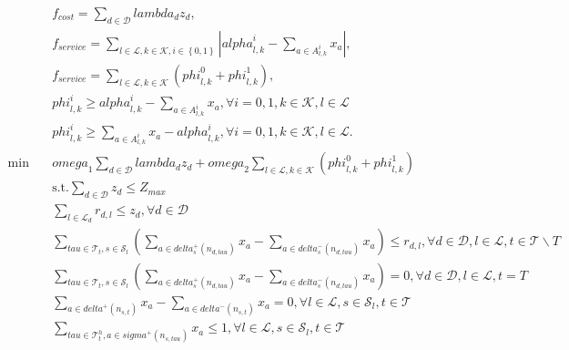 \begin{align}
  & f_{c o s t} = \sum_{d \in \mathcal{D}} \mathit{lambda}_{d} z_{d} , \tag{eq\_0012} \\
  & f_{s e r v i c e} = \sum_{l \in \mathcal{L}, k \in \mathcal{K}, i \in \left\{0 , 1\right\}} \left|\mathit{alpha}_{l , k}^{i} - \sum_{a \in A_{l , k}^{i}} x_{a}\right| , \tag{eq\_0014} \\
  & f_{s e r v i c e} = \sum_{l \in \mathcal{L}, k \in \mathcal{K}} \left(\mathit{phi}_{l , k}^{0} + \mathit{phi}_{l , k}^{1}\right) , \tag{eq\_0018} \\
  & \mathit{phi}_{l , k}^{i} \geq \mathit{alpha}_{l , k}^{i} - \sum_{a \in A_{l , k}^{i}} x_{a} , \forall i = 0 , 1 , k \in \mathcal{K} , l \in \mathcal{L} \tag{eq\_0019} \\
  & \mathit{phi}_{l , k}^{i} \geq \sum_{a \in A_{l , k}^{i}} x_{a} - \mathit{alpha}_{l , k}^{i} , \forall i = 0 , 1 , k \in \mathcal{K} , l \in \mathcal{L} . \tag{eq\_0020} \\
  \min\quad & \mathit{omega}_{1} \sum_{d \in \mathcal{D}} \mathit{lambda}_{d} z_{d} + \mathit{omega}_{2} \sum_{l \in \mathcal{L}, k \in \mathcal{K}} \left(\mathit{phi}_{l , k}^{0} + \mathit{phi}_{l , k}^{1}\right) \tag{eq\_0021} \\
  & \text{s}.\text{t}. \sum_{d \in \mathcal{D}} z_{d} \leq Z_{m a x} \tag{eq\_0023} \\
  & \sum_{l \in \mathcal{L}_{d}} r_{d , l} \leq z_{d} , \forall d \in \mathcal{D} \tag{eq\_0024} \\
  & \sum_{\mathit{tau} \in \mathcal{T}_{t}, s \in \mathcal{S}_{l}} \left(\sum_{a \in \mathit{delta}_{s}^{+} \left(n_{d , \mathit{tau}}\right)} x_{a} - \sum_{a \in \mathit{delta}_{s}^{-} \left(n_{d , \mathit{tau}}\right)} x_{a}\right) \leq r_{d , l} , \forall d \in \mathcal{D} , l \in \mathcal{L} , t \in \mathcal{T} \backslash T \tag{eq\_0025} \\
  & \sum_{\mathit{tau} \in \mathcal{T}_{t}, s \in \mathcal{S}_{l}} \left(\sum_{a \in \mathit{delta}_{s}^{+} \left(n_{d , \mathit{tau}}\right)} x_{a} - \sum_{a \in \mathit{delta}_{s}^{-} \left(n_{d , \mathit{tau}}\right)} x_{a}\right) = 0 , \forall d \in \mathcal{D} , l \in \mathcal{L} , t = T \tag{eq\_0026} \\
  & \sum_{a \in \mathit{delta}^{+} \left(n_{s , t}\right)} x_{a} - \sum_{a \in \mathit{delta}^{-} \left(n_{s , t}\right)} x_{a} = 0 , \forall l \in \mathcal{L} , s \in \mathcal{S}_{l} , t \in \mathcal{T} \tag{eq\_0027} \\
  & \sum_{\mathit{tau} \in \mathcal{T}_{t}^{h}, a \in \mathit{sigma}^{+} \left(n_{s , \mathit{tau}}\right)} x_{a} \leq 1 , \forall l \in \mathcal{L} , s \in \mathcal{S}_{l} , t \in \mathcal{T} \tag{eq\_0028} \\

\end{align}
